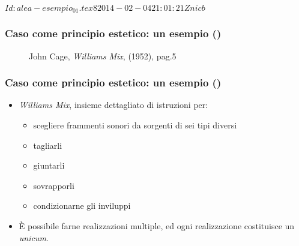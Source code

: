 %
%
\svnInfo $Id: alea-esempio_01.tex 8 2014-02-04 21:01:21Z nicb $

\setcounter{ms}{0}
\begin{frame}
    \frametitle{Caso come principio estetico: un esempio ()}

    \begin{center}
        \begin{figure}
            \caption{John Cage, \emph{Williams Mix}, (1952), pag.5}
        \end{figure}
    \end{center}

\end{frame}

\begin{frame}
    \frametitle{Caso come principio estetico: un esempio ()}

    \begin{itemize}

        \item \emph{Williams Mix}, insieme dettagliato di istruzioni per:

        \begin{itemize}

            \item scegliere frammenti sonori da sorgenti di sei tipi diversi

            \item tagliarli

            \item giuntarli

            \item sovrapporli

            \item condizionarne gli inviluppi

        \end{itemize}

        \item \`E possibile farne realizzazioni multiple,
            ed ogni realizzazione costituisce un \emph{unicum}.

    \end{itemize}

\end{frame}
